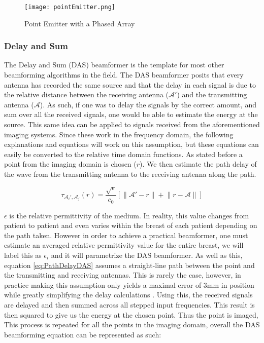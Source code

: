 \begin{figure}
    \texttt{[image: pointEmitter.png]}
    \centering
    \caption{Point Emitter with a Phased Array}
    \label{fig:pointEmitter}
\end{figure}

\subsubsection{Delay and Sum}
The Delay and Sum (DAS) beamformer is the template for most other beamforming algorithms in the field. The DAS
beamformer posits that every antenna has recorded the same source and that the delay in each signal is
due to the relative distance between the receiving antenna ($\mathcal{A}'$) and the transmitting antenna
($\mathcal{A}$). As such, if one was to delay the signals by the correct amount, and sum over all the received signals,
one would be able to estimate the energy at the source. This same idea can be applied to signals received from the
aforementioned imaging systems. Since these work in the frequency domain, the following explanations and equations will
work on this assumption, but these equations can easily be converted to the relative time domain functions. As stated
before a point from the imaging domain is chosen ($r$). We then estimate the path delay of the wave from the
transmitting antenna to the receiving antenna along the path.

\begingroup
\large
\begin{equation}
    \tau_{\mathcal{A}_i', \mathcal{A}_j}(r) = \frac{\sqrt{\epsilon}}{c_0} \left [\lVert \mathcal{A}' - r \rVert + \lVert r - \mathcal{A}\rVert\right ]
    \label{eq:PathDelayDAS}
\end{equation}
\endgroup


$\epsilon$ is the relative permittivity of the medium. In reality, this value changes from patient to patient and even
varies within the breast of each patient depending on the path taken. However in order to achieve a practical beamformer, one must estimate an
averaged relative permittivity value for the entire breast, we will label this as $\epsilon_i$ and it will parametrize
the DAS beamformer. As well as this, equation \ref{eq:PathDelayDAS} assumes a straight-line path between the point and
the transmitting and receiving antennas. This is rarely the case, however, in practice making this assumption
only yields a maximal error of 3mm in position while greatly simplifying the delay calculations
\cite{oloughlinParameterSearchAlgorithms2017}. Using this, the received signals are delayed and then summed across all
stepped input frequencies. This result is then squared to give us the energy at the chosen point. Thus the point is
imaged, This process is repeated for all the points in the imaging domain, overall the DAS beamforming equation can be
represented as such:

